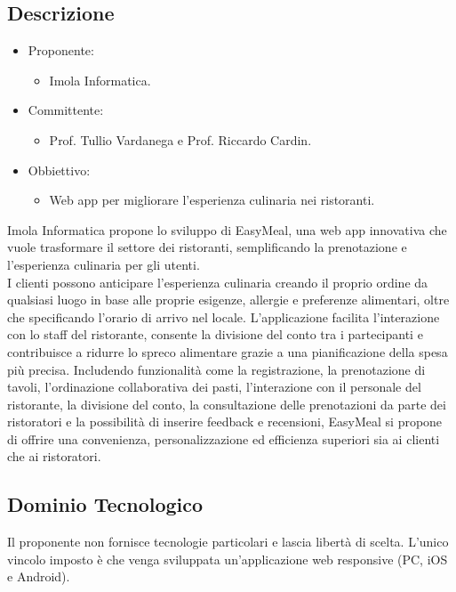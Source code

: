 \documentclass[a4paper, twoside]{article}
\begin{document}
        \subsection{Descrizione}
            \begin{itemize}
                \item Proponente:
                \begin{itemize}
                    \item Imola Informatica.
                \end{itemize}
                \item Committente:
                \begin{itemize}
                    \item Prof. Tullio Vardanega e Prof.
                    Riccardo Cardin.
                \end{itemize}
                \item Obbiettivo:
                \begin{itemize}
                    \item Web app per migliorare l'esperienza culinaria nei ristoranti.
                \end{itemize}
            \end{itemize}
            Imola Informatica propone lo sviluppo di EasyMeal, una web app innovativa che vuole trasformare il settore dei ristoranti, semplificando la prenotazione e l'esperienza culinaria per gli utenti.\\
            I clienti possono anticipare l'esperienza culinaria creando il proprio ordine da qualsiasi luogo in base alle proprie esigenze, allergie e preferenze alimentari, oltre che specificando l'orario di arrivo nel locale. L'applicazione facilita l'interazione con lo staff del ristorante, consente la divisione del conto tra i partecipanti e contribuisce a ridurre lo spreco alimentare grazie a una pianificazione della spesa più precisa. Includendo funzionalità come la registrazione, la prenotazione di tavoli, l'ordinazione collaborativa dei pasti, l'interazione con il personale del ristorante, la divisione del conto, la consultazione delle prenotazioni da parte dei ristoratori e la possibilità di inserire feedback e recensioni, EasyMeal si propone di offrire una convenienza, personalizzazione ed efficienza superiori sia ai clienti che ai ristoratori.
        \subsection{Dominio Tecnologico}
        Il proponente non fornisce tecnologie particolari e lascia libertà di scelta. L'unico vincolo imposto è che venga sviluppata un'applicazione web responsive (PC, iOS e Android).
\end{document}
